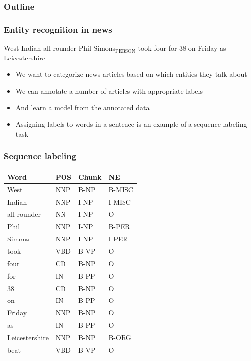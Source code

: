 \documentclass[usenames,dvipsnames]{beamer}
\author[Stroppa and Chrupala]{Grzegorz Chrupa{\l}a and Nicolas Stroppa}
\institute[UdS] %
{
Google\\
Saarland University
}
\date[2010] %
{META}
\newcommand{\voc}[1]{{\color{ForestGreen}#1}}
\begin{document}
\frame{\titlepage}

\begin{frame}
  \frametitle{Outline}
  \tableofcontents
\end{frame}

\begin{frame}
  \frametitle{Entity recognition in news}
  \begin{block}
    {}
West Indian all-rounder \alert{Phil Simons}$_{\text{PERSON}}$ took four for 38 on Friday as
Leicestershire ... 
  \end{block}
  \begin{itemize}
  \item We want to categorize news articles based on which entities
    they talk about
  \item We can annotate a number of articles with appropriate labels
  \item And learn a model from the annotated data
  \item Assigning labels to words in a sentence is an example of a
    \voc{sequence labeling} task
  \end{itemize}
\end{frame}

\begin{frame}
  \frametitle{Sequence labeling}
  \begin{center}
    \begin{small}
  \begin{tabular}{lll|l}
    Word        & POS    & Chunk     & NE      \\\hline
    West        & NNP    & B-NP      & B-MISC  \\
    Indian      & NNP    & I-NP      & I-MISC  \\
    all-rounder & NN     & I-NP      & O       \\
    Phil        & NNP    & I-NP      & B-PER   \\
    Simons      & NNP    & I-NP      & I-PER   \\
    took        & VBD    & B-VP      & O       \\
    four        & CD     & B-NP      & O       \\
    for         & IN     & B-PP      & O       \\
    38          & CD     & B-NP      & O       \\
    on          & IN     & B-PP      & O       \\
    Friday      & NNP    & B-NP      & O       \\
    as          & IN     & B-PP      & O       \\
    Leicestershire& NNP  & B-NP      & B-ORG   \\
    beat        & VBD    & B-VP      & O       \\
  \end{tabular}
    \end{small}
  \end{center}
\end{frame}
\end{document}
